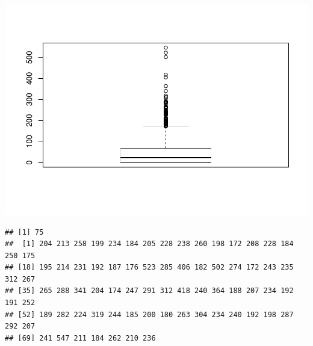 \documentclass[]{article}
\newenvironment{Shaded}{\begin{snugshade}}{\end{snugshade}}
\newcommand{\KeywordTok}[1]{\textcolor[rgb]{0.13,0.29,0.53}{\textbf{#1}}}
\newcommand{\DecValTok}[1]{\textcolor[rgb]{0.00,0.00,0.81}{#1}}
\newcommand{\StringTok}[1]{\textcolor[rgb]{0.31,0.60,0.02}{#1}}
\newcommand{\ControlFlowTok}[1]{\textcolor[rgb]{0.13,0.29,0.53}{\textbf{#1}}}
\newcommand{\OperatorTok}[1]{\textcolor[rgb]{0.81,0.36,0.00}{\textbf{#1}}}
\newcommand{\NormalTok}[1]{#1}
\begin{document}
\begin{Shaded}
\end{Shaded}

\includegraphics{EDA_files/figure-latex/unnamed-chunk-90-1.pdf}

\begin{verbatim}
## [1] 75
##  [1] 204 213 258 199 234 184 205 228 238 260 198 172 208 228 184 250 175
## [18] 195 214 231 192 187 176 523 285 406 182 502 274 172 243 235 312 267
## [35] 265 288 341 204 174 247 291 312 418 240 364 188 207 234 192 191 252
## [52] 189 282 224 319 244 185 200 180 263 304 234 240 192 198 287 292 207
## [69] 241 547 211 184 262 210 236
\end{verbatim}
\end{document}
